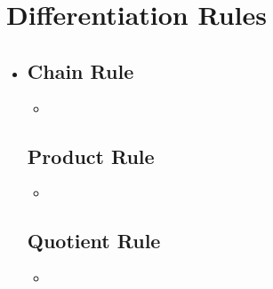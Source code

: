 \section{Differentiation Rules}
\begin{itemize}
  \item []
  
  \subsection{Chain Rule}
  \begin{itemize}
    \item 
  \end{itemize}
  
  \subsection{Product Rule}
  \begin{itemize}
    \item 
  \end{itemize}
  
  \subsection{Quotient Rule}
  \begin{itemize}
    \item 
  \end{itemize}
  
\end{itemize}

